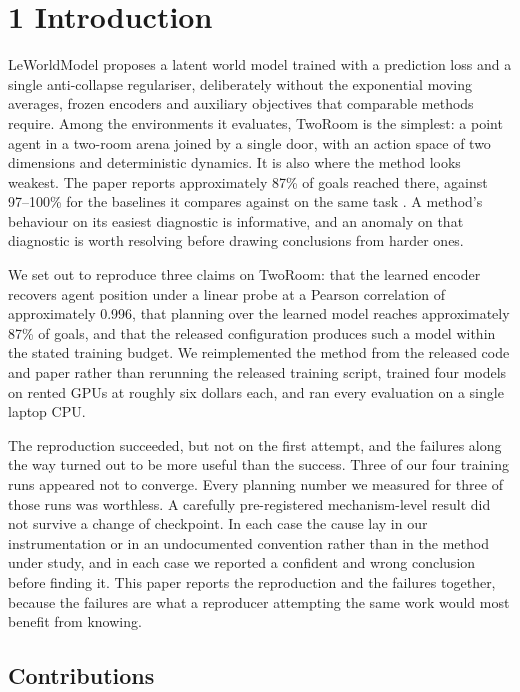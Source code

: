 \documentclass[10pt]{article}
\begin{document}
\section{1 Introduction}\label{introduction}

LeWorldModel \citep{maes2026lewm} proposes a latent world model trained with a
prediction loss and a single anti-collapse regulariser, deliberately without the
exponential moving averages, frozen encoders and auxiliary objectives that
comparable methods require. Among the environments it evaluates, TwoRoom is the
simplest: a point agent in a two-room arena joined by a single door, with an
action space of two dimensions and deterministic dynamics. It is also where the
method looks weakest. The paper reports approximately 87\% of goals reached
there, against 97--100\% for the baselines it compares against on the same task
\citep[Fig.~6]{maes2026lewm}. A method's behaviour on its easiest diagnostic is informative,
and an anomaly on that diagnostic is worth resolving before drawing conclusions
from harder ones.

We set out to reproduce three claims on TwoRoom: that the learned encoder
recovers agent position under a linear probe at a Pearson correlation of approximately 0.996, that
planning over the learned model reaches approximately 87\% of goals, and that the
released configuration produces such a model within the stated training budget.
We reimplemented the method from the released code and paper rather than
rerunning the released training script, trained four models on rented GPUs at
roughly six dollars each, and ran every evaluation on a single laptop CPU.

The reproduction succeeded, but not on the first attempt, and the failures along
the way turned out to be more useful than the success. Three of our four
training runs appeared not to converge. Every planning number we measured for
three of those runs was worthless. A carefully pre-registered mechanism-level
result did not survive a change of checkpoint. In each case the cause lay in our
instrumentation or in an undocumented convention rather than in the method under
study, and in each case we reported a confident and wrong conclusion before
finding it. This paper reports the reproduction and the failures together,
because the failures are what a reproducer attempting the same work would most
benefit from knowing.

\subsection{Contributions}\label{contributions}
\end{document}
